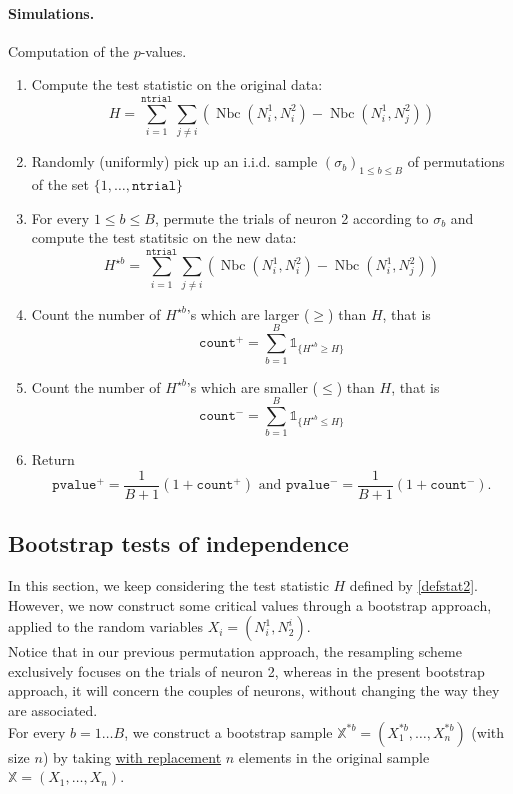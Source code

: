 \documentclass[a4paper,oneside,10pt]{article}
\newcommand{\pa}[1]{\ensuremath{\left( #1 \right)}}
\newcommand{\Nbc}{\operatorname{Nbc}}
\newcommand{\X}{\ensuremath{\mathds{X}}}
\newcommand{\1}[1]{\ensuremath{\mathds{1}_{\{ #1 \}}}}  %
\begin{document}
\paragraph{Simulations.}
Computation of the $p$-values.
\begin{enumerate}
\item Compute the test statistic on the original data: 
$$H=\sum_{i=1}^{\texttt{ntrial}} \sum_{j\neq i}\left(\Nbc(N^1_i,N^2_{i})-\Nbc(N_i^1,N_j^2)\right)$$
\item Randomly (uniformly) pick up an i.i.d. sample $\pa{\sigma_b}_{1\leq b\leq B}$ of permutations of the set $\{1,\ldots,\texttt{ntrial}\}$
\item For every $1\leq b\leq B$, permute the trials of neuron 2 according to $\sigma_b$ and compute the test statitsic on the new data:
$$H^{\star b}=\sum_{i=1}^{\texttt{ntrial}} \sum_{j\neq i}\left(\Nbc(N^1_i,N^2_{i})-\Nbc(N_i^1,N_j^2)\right)$$
\item Count the number of $H^{\star b}$'s which are larger ($\geq$) than $H$, that is
$$\texttt{count}^+=\sum_{b=1}^B \1{H^{\star b}\geq H}$$
\item Count the number of $H^{\star b}$'s which are smaller ($\leq$) than $H$, that is
$$\texttt{count}^-=\sum_{b=1}^B \1{H^{\star b}\leq H}$$
\item Return $$\texttt{pvalue}^+=\frac{1}{B+1}\pa{1+\texttt{count}^+}\textrm{ and }\texttt{pvalue}^-=\frac{1}{B+1}\pa{1+\texttt{count}^-}.$$
\end{enumerate}

\subsection{Bootstrap tests of independence}

In this section, we keep considering the test statistic $H$ defined by \eqref{defstat2}. However, we now construct some critical values through a bootstrap approach, applied to the random variables $X_i=(N_i^1,N_2^i)$.\\

Notice that in our previous permutation approach, the resampling scheme exclusively focuses on the trials of neuron 2, whereas in the present bootstrap approach, it will concern the couples of neurons, without changing the way they are associated.\\

For every $b=1\ldots B$, we construct a bootstrap sample $\X^{* b}=(X_1^{* b},\ldots, X_n^{* b})$ (with size $n$) by taking \underline{with replacement} $n$ elements in the original sample $\X=(X_1,\ldots,X_n)$.
\end{document}
